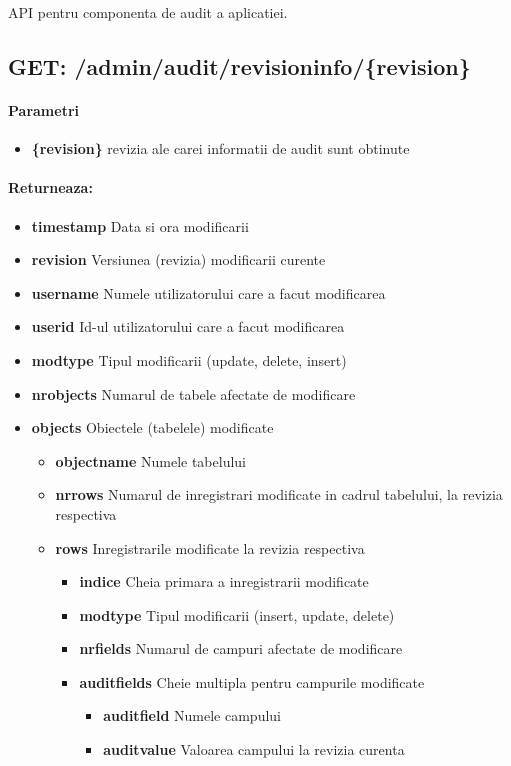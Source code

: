 API pentru componenta de audit a aplicatiei.  \subsection*{GET: /admin/audit/revisioninfo/\{revision\}}

\paragraph{Parametri}
\begin{itemize}
\item \textbf{\{revision\}}
 revizia ale carei informatii de audit sunt obtinute
 \end{itemize}
\paragraph{Returneaza:}
\begin{itemize}
\item \textbf{timestamp}
 Data si ora modificarii
\item \textbf{revision}
 Versiunea (revizia) modificarii curente
\item \textbf{username}
 Numele utilizatorului care a facut modificarea
\item \textbf{userid}
 Id-ul utilizatorului care a facut modificarea
\item \textbf{modtype}
 Tipul modificarii (update, delete, insert)
\item \textbf{nrobjects}
 Numarul de tabele afectate de modificare
\item\textbf{objects}
 Obiectele (tabelele) modificate \begin{itemize}
\item \textbf{objectname}
 Numele tabelului
\item \textbf{nrrows}
 Numarul de inregistrari modificate in cadrul tabelului, la revizia respectiva
\item\textbf{rows}
 Inregistrarile modificate la revizia respectiva \begin{itemize}
\item \textbf{indice}
 Cheia primara a inregistrarii modificate
\item \textbf{modtype}
 Tipul modificarii (insert, update, delete)
\item \textbf{nrfields}
 Numarul de campuri afectate de modificare 
\item\textbf{auditfields}
 Cheie multipla pentru campurile modificate \begin{itemize}
\item \textbf{auditfield}
 Numele campului
\item \textbf{auditvalue}
 Valoarea campului la revizia curenta
 \end{itemize}
 \end{itemize}
 \end{itemize}
 \end{itemize}
